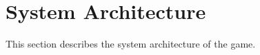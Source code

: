 \chapter{System Architecture} \label{ch:system_architecture}
This section describes the system architecture of the game.


